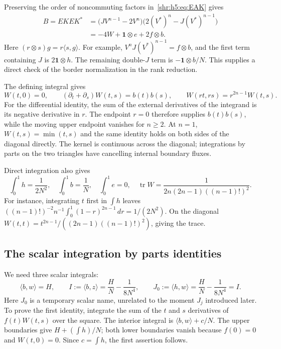 \documentclass[11pt,letterpaper]{article}
\numberwithin{equation}{section}
\theoremstyle{definition}
\newcommand{\1}{\mathbf 1}
\newcommand{\one}{\mathbf1}
\newcommand{\ip}[2]{\langle #1,#2\rangle}
\DeclareMathOperator{\tr}{tr}
\newcommand{\dd}{\,d}
\begin{document}
Preserving the order of noncommuting factors in~\eqref{shr:h5:eq:EAK} gives
\begin{align}
 B=EKEK^*
 &=\bigl(JV^{n-1}-2V^n\bigr)
       \bigl(2(V^*)^n-J(V^*)^{n-1}\bigr)\\
 &=-4W+\one\otimes e+2f\otimes b.
 \label{shr:h5:eq:rank2}
\end{align}
Here $(r\otimes s)g=r\ip s g$. For example,
$V^nJ(V^*)^{n-1}=f\otimes b$, and the first term containing $J$
is $2\one\otimes h$. The remaining double-$J$ term is
$-\one\otimes b/N$. This supplies a direct check of the border
normalization in the rank reduction.

The defining integral gives
\begin{equation}
 W(t,0)=0,\qquad
 (\partial_t+\partial_s)W(t,s)=b(t)b(s),\qquad
 W(rt,rs)=r^{2n-1}W(t,s).
 \label{shr:h5:eq:W-identities}
\end{equation}
For the differential identity, the sum of the external derivatives of
the integrand is its negative derivative in $r$. The endpoint $r=0$
therefore supplies $b(t)b(s)$, while the moving upper endpoint vanishes
for $n\ge2$. At $n=1$, $W(t,s)=\min(t,s)$ and the same identity holds
on both sides of the diagonal directly. The kernel is continuous across
the diagonal; integrations by parts on the two triangles have cancelling
internal boundary fluxes.

Direct integration also gives
\begin{equation}
 \int_0^1h=\frac1{2N^2},\quad
 \int_0^1b=\frac1N,\quad
 \int_0^1e=0,\quad
 \tr W=\frac1{2n(2n-1)((n-1)!)^2}.
 \label{shr:h5:eq:basic-integrals}
\end{equation}
For instance, integrating $t$ first in $\int h$ leaves
$((n-1)!)^{-2}n^{-1}\int_0^1(1-r)^{2n-1}\dd r=1/(2N^2)$.
On the diagonal $W(t,t)=t^{2n-1}/((2n-1)((n-1)!)^2)$, giving the trace.

\subsection{The scalar integration by parts identities}
We need three scalar integrals:
\begin{equation}
 \ip b w=H,\qquad I:=\ip b z=\frac HN-\frac1{8N^4},\qquad
 J_0:=\ip h w=\frac HN-\frac1{8N^4}=I.
 \label{shr:h5:eq:scalar-identities}
\end{equation}
Here $J_0$ is a temporary scalar name, unrelated to the moment $J_j$
introduced later. To prove the first identity, integrate the sum of the
$t$ and $s$ derivatives of $f(t)W(t,s)$ over the square. The interior
integral is
$\ip b w+c/N$. The upper boundaries give
$H+(\int h)/N$; both lower boundaries vanish because $f(0)=0$ and
$W(t,0)=0$. Since $c=\int h$, the first assertion follows.
\end{document}
